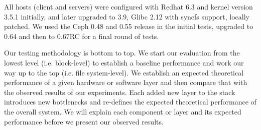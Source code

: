 All hosts  (client and servers) were configured
with Redhat 6.3 and kernel version 3.5.1 initially, and later upgraded to 3.9,
Glibc 2.12 with syncfs support, locally patched.  We used the Ceph 0.48 and
0.55 release in the initial tests, upgraded to 0.64 and then to 0.67RC for a
final round of tests.

Our testing methodology is bottom to top. We start our evaluation from the
lowest level (i.e. block-level)  to establish a baseline performance and work
our way up to the top (i.e. file system-level). We establish an expected
theoretical performance of a given hardware or software layer and then compare
that with the observed results of our experiments. Each added new layer to the
stack introduces new bottlenecks and re-defines the expected theoretical
performance of the overall system. We will explain each component or layer and
its expected performance before we present our observed results.

